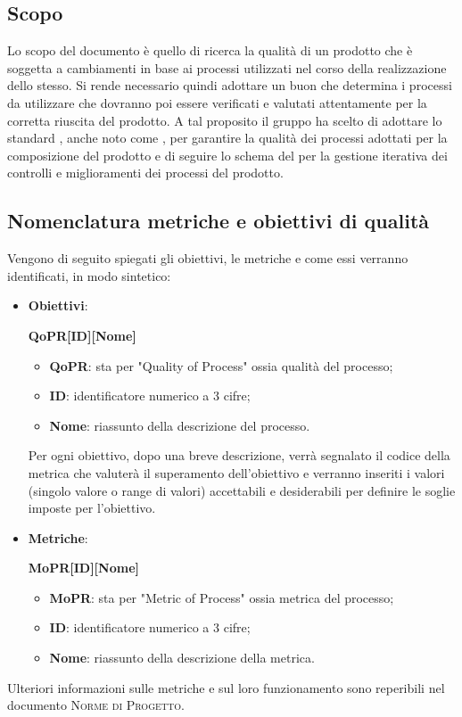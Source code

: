 \documentclass[../piano-di-qualifica.tex]{subfiles}
\begin{document}
\subsection{Scopo}%
\label{sub:scopo}
Lo scopo del documento è quello di ricerca la qualità di un prodotto che è soggetta a cambiamenti in base ai processi utilizzati nel corso della realizzazione dello stesso.
Si rende necessario quindi adottare un buon  che determina i processi da utilizzare che dovranno poi essere verificati e valutati attentamente per la corretta riuscita del prodotto.
A tal proposito il gruppo ha scelto di adottare lo standard , anche noto come , per garantire la qualità dei processi adottati per la composizione del prodotto e di seguire lo schema del  per la gestione iterativa dei controlli e miglioramenti dei processi del prodotto.

\subsection{Nomenclatura metriche e obiettivi di qualità}%
\label{sub:nomenclatura_metriche_e_obiettivi_di_qualita}
Vengono di seguito spiegati gli obiettivi, le metriche e come essi verranno identificati, in modo sintetico:
\begin{itemize}
    \item \textbf{Obiettivi}: 
    \begin{center}
        \centering
        \textbf{QoPR[ID][Nome]}
    \end{center}
        \begin{itemize}
            \item \textbf{QoPR}: sta per "Quality of Process" ossia qualità del processo;
            \item \textbf{ID}: identificatore numerico a 3 cifre;
            \item \textbf{Nome}: riassunto della descrizione del processo.
        \end{itemize}
        Per ogni obiettivo, dopo una breve descrizione, verrà segnalato il codice della metrica che valuterà il superamento dell'obiettivo e verranno inseriti i valori (singolo valore o range di valori) accettabili e desiderabili per definire le soglie imposte per l'obiettivo.
    \item \textbf{Metriche}: 
    \begin{center}
        \centering
        \textbf{MoPR[ID][Nome]}
    \end{center}
        \begin{itemize}
            \item \textbf{MoPR}: sta per "Metric of Process" ossia metrica del processo;
            \item \textbf{ID}: identificatore numerico a 3 cifre;
            \item \textbf{Nome}: riassunto della descrizione della metrica.
        \end{itemize}
\end{itemize}  
Ulteriori informazioni sulle metriche e sul loro funzionamento sono reperibili nel documento \textsc{Norme di Progetto}.
\end{document}
